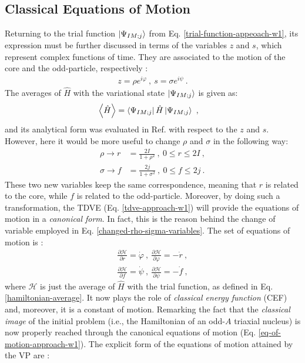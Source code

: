 \subsection{Classical Equations of Motion}
\label{equations-of-motion-section}

Returning to the trial function $\ket{\Psi_{IM;j}}$ from Eq. \ref{trial-function-appeoach-w1}, its expression must be further discussed in terms of the variables $z$ and $s$, which represent complex functions of time. They are associated to the motion of the core and the odd-particle, respectively \cite{budaca2018tilted}:
\begin{align}
    z=\rho e^{i\varphi}\ ,\ s=\sigma e^{i\psi}\ .
    \label{z-s-variables}
\end{align}
The averages of $\hat{H}$ with the variational state $\ket{\Psi_{IM;j}}$ is given as:
\begin{align}
    \left\langle \hat{H} \right\rangle&=\bra{\Psi_{IM;j}}\hat{H}\ket{\Psi_{IM;j}}\ ,
    \label{hamiltonian-average}
\end{align}
and its analytical form was evaluated in Ref. \cite{raduta2017semiclassical} with respect to the $z$ and $s$. However, here it would be more useful to change $\rho$ and $\sigma$ in the following way:
\begin{align}
    \rho \to r&=\frac{2I}{1+\rho^2}\ ,\ 0\leq r\leq 2I\ ,\nonumber\\
    \sigma \to f&=\frac{2j}{1+\sigma^2}\ ,\ 0\leq f\leq 2j\ .
    \label{changed-rho-sigma-variables}
\end{align}
These two new variables keep the same correspondence, meaning that $r$ is related to the core, while $f$ is related to the odd-particle. Moreover, by doing such a transformation, the TDVE (Eq. \ref{tdve-approach-w1}) will provide the equations of motion in a \emph{canonical form}. In fact, this is the reason behind the change of variable employed in Eq. \ref{changed-rho-sigma-variables}. The set of equations of motion is \cite{raduta2020approach}:
\begin{align}
    \frac{\partial \mathcal{H}}{\partial r}=\dot{\varphi}\ ,\ \frac{\partial \mathcal{H}}{\partial \varphi}=-\dot{r}\ ,\nonumber\\
    \frac{\partial \mathcal{H}}{\partial f}=\dot{\psi}\ ,\ \frac{\partial \mathcal{H}}{\partial \psi}=-\dot{f}\ ,
    \label{eq-of-motion-approach-w1}
\end{align}
where $\mathcal{H}$ is just the average of $\hat{H}$ with the trial function, as defined in Eq. \ref{hamiltonian-average}. It now plays the role of \emph{classical energy function} (CEF) and, moreover, it is a constant of motion. Remarking the fact that the \emph{classical image} of the initial problem (i.e., the Hamiltonian of an odd-$A$ triaxial nucleus) is now properly reached through the canonical equations of motion (Eq. \ref{eq-of-motion-approach-w1}). The explicit form of the equations of motion attained by the VP are \cite{raduta2020approach}:
